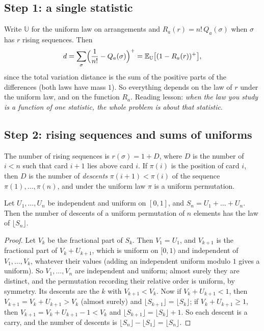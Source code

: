 \subsection*{Step 1: a single statistic}

Write $\mathbb U$ for the uniform law on arrangements and $R_a(r)=n!\,Q_a(\sigma)$ when $\sigma$ has $r$ rising sequences. Then
\[
d=\sum_\sigma\Bigl(\frac1{n!}-Q_a(\sigma)\Bigr)^+=\mathbb E_{\mathbb U}\bigl[(1-R_a(r))^+\bigr],
\]
since the total variation distance is the sum of the positive parts of the differences (both laws have mass $1$). So everything depends on the law of $r$
under the uniform law, and on the function $R_a$. Reading lesson: \emph{when the law you study is a function of one statistic, the whole problem
is about that statistic}.

\subsection*{Step 2: rising sequences and sums of uniforms}

The number of rising sequences is $r(\sigma)=1+D$, where $D$ is the number of $i<n$ such that card $i+1$ lies above card $i$. If $\pi(i)$ is the position of card $i$,
then $D$ is the number of \emph{descents} $\pi(i+1)<\pi(i)$ of the sequence $\pi(1),\dots,\pi(n)$, and under the uniform law $\pi$ is a uniform permutation.

\begin{lemma}[Tanny, 1973]\label{lem:tanny}
Let $U_1,\dots,U_n$ be independent and uniform on $[0,1]$, and $S_n=U_1+\dots+U_n$. Then the number of descents of a uniform permutation of $n$ elements
has the law of $\lfloor S_n\rfloor$.
\end{lemma}

\begin{proof}
Let $V_k$ be the fractional part of $S_k$. Then $V_1=U_1$, and $V_{k+1}$ is the fractional part of $V_k+U_{k+1}$, which is uniform on $[0,1)$ and independent of $V_1,\dots,V_k$, whatever their values
(adding an independent uniform modulo $1$ gives a uniform). So $V_1,\dots,V_n$ are independent and uniform; almost surely they are distinct, and the permutation
recording their relative order is uniform, by symmetry. Its descents are the $k$ with $V_{k+1}<V_k$. Now if $V_k+U_{k+1}<1$, then $V_{k+1}=V_k+U_{k+1}>V_k$ (almost surely) and
$\lfloor S_{k+1}\rfloor=\lfloor S_k\rfloor$; if $V_k+U_{k+1}\ge1$, then $V_{k+1}=V_k+U_{k+1}-1<V_k$ and $\lfloor S_{k+1}\rfloor=\lfloor S_k\rfloor+1$. So each descent is a carry, and the number of descents is
$\lfloor S_n\rfloor-\lfloor S_1\rfloor=\lfloor S_n\rfloor$.
\end{proof}


